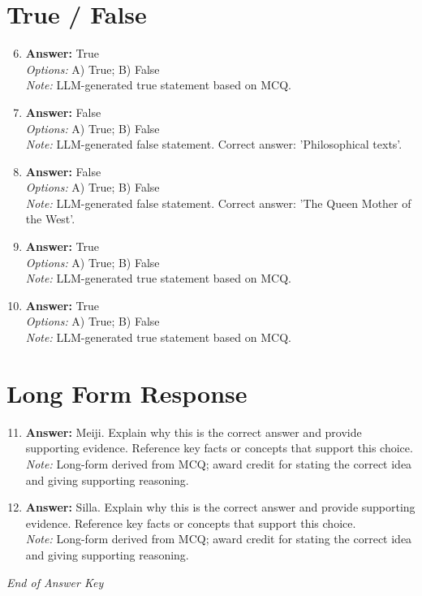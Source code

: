 \documentclass[12pt]{article}
\begin{document}
\section*{True / False}
\begin{enumerate}[label=\arabic*.]
\setcounter{enumi}{5}
\item \textbf{Answer:} True
\\ \textit{Options:} A) True; B) False
\\ \textit{Note:} LLM-generated true statement based on MCQ.
\item \textbf{Answer:} False
\\ \textit{Options:} A) True; B) False
\\ \textit{Note:} LLM-generated false statement. Correct answer: 'Philosophical texts'.
\item \textbf{Answer:} False
\\ \textit{Options:} A) True; B) False
\\ \textit{Note:} LLM-generated false statement. Correct answer: 'The Queen Mother of the West'.
\item \textbf{Answer:} True
\\ \textit{Options:} A) True; B) False
\\ \textit{Note:} LLM-generated true statement based on MCQ.
\item \textbf{Answer:} True
\\ \textit{Options:} A) True; B) False
\\ \textit{Note:} LLM-generated true statement based on MCQ.
\end{enumerate}

\section*{Long Form Response}
\begin{enumerate}[label=\arabic*.]
\setcounter{enumi}{10}
\item \textbf{Answer:} Meiji. Explain why this is the correct answer and provide supporting evidence. Reference key facts or concepts that support this choice.
\\ \textit{Note:} Long-form derived from MCQ; award credit for stating the correct idea and giving supporting reasoning.
\item \textbf{Answer:} Silla. Explain why this is the correct answer and provide supporting evidence. Reference key facts or concepts that support this choice.
\\ \textit{Note:} Long-form derived from MCQ; award credit for stating the correct idea and giving supporting reasoning.
\end{enumerate}

\vfill
\noindent\textit{End of Answer Key}
\end{document}
